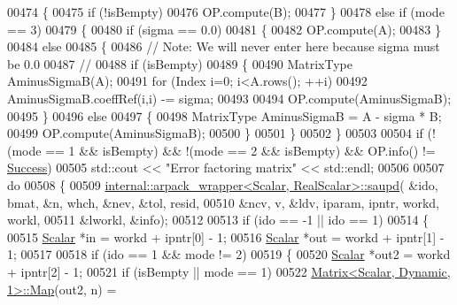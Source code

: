 \begin{DoxyCode}
00474   \{
00475       \textcolor{keywordflow}{if} (!isBempty)
00476           OP.compute(B);
00477   \}
00478   \textcolor{keywordflow}{else} \textcolor{keywordflow}{if} (mode == 3)
00479   \{
00480       \textcolor{keywordflow}{if} (sigma == 0.0)
00481       \{
00482           OP.compute(A);
00483       \}
00484       \textcolor{keywordflow}{else}
00485       \{
00486           \textcolor{comment}{// Note: We will never enter here because sigma must be 0.0}
00487           \textcolor{comment}{//}
00488           \textcolor{keywordflow}{if} (isBempty)
00489           \{
00490             MatrixType AminusSigmaB(A);
00491             \textcolor{keywordflow}{for} (Index i=0; i<A.rows(); ++i)
00492                 AminusSigmaB.coeffRef(i,i) -= sigma;
00493             
00494             OP.compute(AminusSigmaB);
00495           \}
00496           \textcolor{keywordflow}{else}
00497           \{
00498               MatrixType AminusSigmaB = A - sigma * B;
00499               OP.compute(AminusSigmaB);
00500           \}
00501       \}
00502   \}
00503  
00504   \textcolor{keywordflow}{if} (!(mode == 1 && isBempty) && !(mode == 2 && isBempty) && OP.info() != 
      \hyperlink{group__enums_gga85fad7b87587764e5cf6b513a9e0ee5ea52581b035f4b59c203b8ff999ef5fcea}{Success})
00505       std::cout << \textcolor{stringliteral}{"Error factoring matrix"} << std::endl;
00506 
00507   \textcolor{keywordflow}{do}
00508   \{
00509     \hyperlink{struct_eigen_1_1internal_1_1arpack__wrapper}{internal::arpack\_wrapper<Scalar, RealScalar>::saupd}(
      &ido, bmat, &n, whch, &nev, &tol, resid, 
00510                                                         &ncv, v, &ldv, iparam, ipntr, workd, workl,
00511                                                         &lworkl, &info);
00512 
00513     \textcolor{keywordflow}{if} (ido == -1 || ido == 1)
00514     \{
00515       \hyperlink{class_eigen_1_1_arpack_generalized_self_adjoint_eigen_solver_ab1182405bfe87a505d4b7a8311c661ec}{Scalar} *in  = workd + ipntr[0] - 1;
00516       \hyperlink{class_eigen_1_1_arpack_generalized_self_adjoint_eigen_solver_ab1182405bfe87a505d4b7a8311c661ec}{Scalar} *out = workd + ipntr[1] - 1;
00517 
00518       \textcolor{keywordflow}{if} (ido == 1 && mode != 2)
00519       \{
00520           \hyperlink{class_eigen_1_1_arpack_generalized_self_adjoint_eigen_solver_ab1182405bfe87a505d4b7a8311c661ec}{Scalar} *out2 = workd + ipntr[2] - 1;
00521           \textcolor{keywordflow}{if} (isBempty || mode == 1)
00522             \hyperlink{group___core___module_class_eigen_1_1_matrix}{Matrix<Scalar, Dynamic, 1>::Map}(out2, n) = 

\end{DoxyCode}
